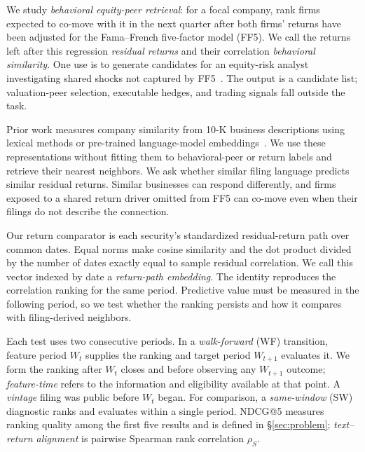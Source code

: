 \documentclass[sigconf,anonymous]{acmart}
\begin{document}
We study \emph{behavioral equity-peer retrieval}: for a focal company, rank firms
expected to co-move with it in the next quarter after both firms' returns have
been adjusted for the Fama--French five-factor model (FF5).  We call the returns
left after this regression \emph{residual returns} and their correlation
\emph{behavioral similarity}.  One use is to generate candidates for an
equity-risk analyst investigating shared shocks not captured by
FF5~\citep{bonne2022peer}.  The output is a candidate list; valuation-peer
selection, executable hedges, and trading signals fall outside the task.

Prior work measures company similarity from 10-K business descriptions using
lexical methods or pre-trained language-model
embeddings~\citep{hoberg2016text,vamvourellis2023company}.  We use these
representations without fitting them to behavioral-peer or return labels and
retrieve their nearest neighbors.  We ask whether similar filing language
predicts similar residual returns.  Similar businesses can respond differently,
and firms exposed to a shared return driver omitted from FF5 can co-move even
when their filings do not describe the connection.

Our return comparator is each security's standardized residual-return path over
common dates.  Equal norms make cosine similarity and the dot product divided by
the number of dates exactly equal to sample residual correlation.  We call this
vector indexed by date a \emph{return-path embedding}.  The identity reproduces
the correlation ranking for the same period.  Predictive value must be measured
in the following period, so we test whether the ranking persists and how it compares
with filing-derived neighbors.

Each test uses two consecutive periods.  In a \emph{walk-forward} (WF)
transition, feature period $W_t$ supplies the ranking and target period
$W_{t+1}$ evaluates it.  We form the ranking after $W_t$ closes
and before observing any $W_{t+1}$ outcome; \emph{feature-time} refers to the
information and eligibility available at that point.  A \emph{vintage} filing
was public before $W_t$ began.  For comparison, a \emph{same-window} (SW)
diagnostic ranks and evaluates within a single period.  NDCG@5 measures ranking
quality among the first five results and is defined in
\S\ref{sec:problem}; \emph{text--return alignment} is pairwise Spearman rank
correlation $\rho_S$.
\end{document}
